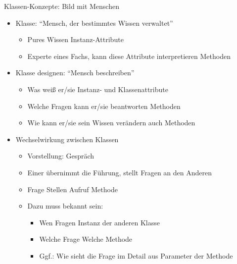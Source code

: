 \begin{frame}[fragile]{Klassen-Konzepte: Bild mit Menschen}
%
\begin{itemize}
\item Klasse: \enquote{Mensch, der bestimmtes Wissen verwaltet}
	\begin{itemize}
	\item Pures Wissen \thus Instanz-Attribute
	\item Experte eines Fachs, kann diese Attribute interpretieren \thus Methoden
	\end{itemize}
\item Klasse designen: \enquote{Mensch beschreiben}
	\begin{itemize}
	\item Was weiß er/sie \thus Instanz- und Klassenattribute
	\item Welche Fragen kann er/sie beantworten \thus Methoden
	\item Wie kann er/sie sein Wissen verändern \thus auch Methoden
	\end{itemize}
\item Wechselwirkung zwischen Klassen
	\begin{itemize}
	\item Vorstellung: Gespräch
	\item Einer übernimmt die Führung, stellt Fragen an den Anderen
	\item Frage Stellen \thus Aufruf Methode
	\item Dazu muss bekannt sein:
		\begin{itemize}
		\item Wen Fragen \thus Instanz der anderen Klasse
		\item Welche Frage \thus Welche Methode
		\item Ggf.: Wie sieht die Frage im Detail aus \thus Parameter der Methode
		\end{itemize}
	\end{itemize}
\end{itemize}
%
\end{frame}


